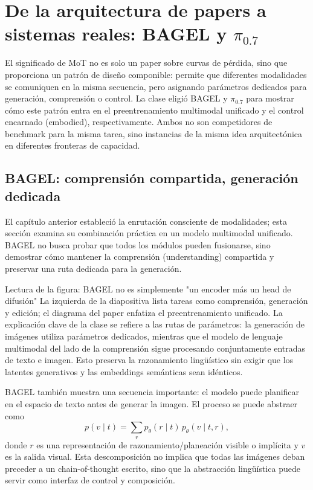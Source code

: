 \section{De la arquitectura de papers a sistemas reales: BAGEL y \texorpdfstring{$\pi_{0.7}$}{pi0.7}}

El significado de MoT no es solo un paper sobre curvas de pérdida, sino que proporciona un patrón de diseño componible: permite que diferentes modalidades se comuniquen en la misma secuencia, pero asignando parámetros dedicados para generación, comprensión o control. La clase eligió BAGEL y $\pi_{0.7}$ para mostrar cómo este patrón entra en el preentrenamiento multimodal unificado y el control encarnado (embodied), respectivamente. Ambos no son competidores de benchmark para la misma tarea, sino instancias de la misma idea arquitectónica en diferentes fronteras de capacidad.

\subsection{BAGEL: comprensión compartida, generación dedicada}

El capítulo anterior estableció la enrutación consciente de modalidades; esta sección examina su combinación práctica en un modelo multimodal unificado. BAGEL no busca probar que todos los módulos pueden fusionarse, sino demostrar cómo mantener la comprensión (understanding) compartida y preservar una ruta dedicada para la generación.


\begin{knowledgebox}{Lectura de la figura: BAGEL no es simplemente "un encoder más un head de difusión"}
La izquierda de la diapositiva lista tareas como comprensión, generación y edición; el diagrama del paper enfatiza el preentrenamiento unificado. La explicación clave de la clase se refiere a las rutas de parámetros: la generación de imágenes utiliza parámetros dedicados, mientras que el modelo de lenguaje multimodal del lado de la comprensión sigue procesando conjuntamente entradas de texto e imagen. Esto preserva la razonamiento lingüístico sin exigir que los latentes generativos y las embeddings semánticas sean idénticos.
\end{knowledgebox}

BAGEL también muestra una secuencia importante: el modelo puede planificar en el espacio de texto antes de generar la imagen. El proceso se puede abstraer como
$$
p(v\mid t)=\sum_r p_\theta(r\mid t)\,p_\theta(v\mid t,r),
$$
donde $r$ es una representación de razonamiento/planeación visible o implícita y $v$ es la salida visual. Esta descomposición no implica que todas las imágenes deban preceder a un chain-of-thought escrito, sino que la abstracción lingüística puede servir como interfaz de control y composición.

